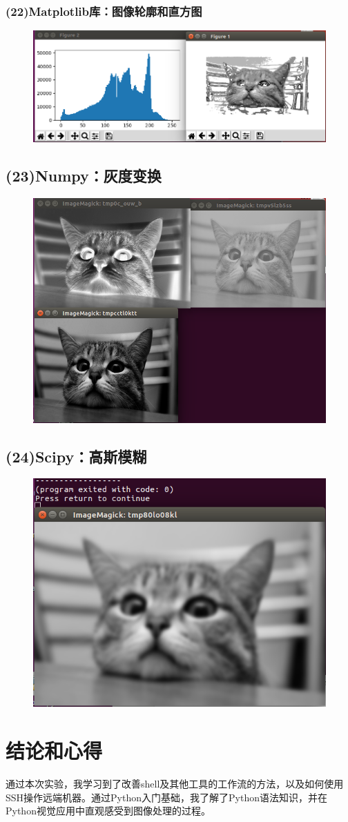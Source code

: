 \documentclass{article}
\begin{document}
\subsubsection{(22)Matplotlib库：图像轮廓和直方图}

\begin{figure}[h]
    \centering
    \includegraphics[width=0.75\linewidth]{image26.png}
\end{figure}

\subsection{(23)Numpy：灰度变换}

\begin{figure}[h]
    \centering
    \includegraphics[width=0.75\linewidth]{image27.png}
\end{figure}

\subsection{(24)Scipy：高斯模糊}

\begin{figure}[h]
    \centering
    \includegraphics[width=0.5\linewidth]{image28.png}
\end{figure}

\section{结论和心得}
通过本次实验，我学习到了改善shell及其他工具的工作流的方法，以及如何使用SSH操作远端机器。通过Python入门基础，我了解了Python语法知识，并在Python视觉应用中直观感受到图像处理的过程。
\end{document}
